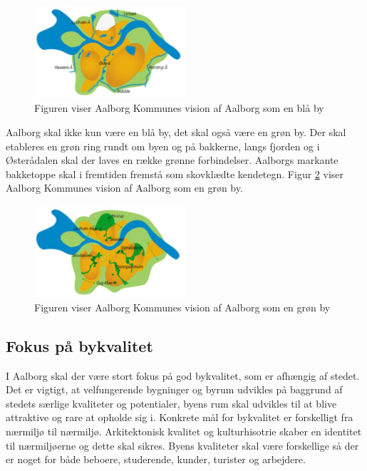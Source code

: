 \begin{figure}[H] 
\centering
\includegraphics[width=0.50\textwidth]{billeder/Byudviklingsprincipper5}
\caption{Figuren viser Aalborg Kommunes vision af Aalborg som en blå by}
\label{fig:Byudviklingsprincipper5}
\end{figure}

Aalborg skal ikke kun være en blå by, det skal også være en grøn by. Der skal etableres en grøn ring rundt om byen og på bakkerne, langs fjorden og i Østerådalen skal der laves en række grønne forbindelser. Aalborgs markante bakketoppe skal i fremtiden fremstå som skovklædte kendetegn. Figur \ref{fig:Byudviklingsprincipper6} viser Aalborg Kommunes vision af Aalborg som en grøn by.

\begin{figure}[H] 
\centering
\includegraphics[width=0.50\textwidth]{billeder/Byudviklingsprincipper6}
\caption{Figuren viser Aalborg Kommunes vision af Aalborg som en grøn by}
\label{fig:Byudviklingsprincipper6}
\end{figure}


\subsection{Fokus på bykvalitet}
I Aalborg skal der være stort fokus på god bykvalitet, som er afhængig af stedet. Det er vigtigt, at velfungerende bygninger og byrum udvikles på baggrund af stedets særlige kvaliteter og potentialer, byens rum skal udvikles til at blive attraktive og rare at opholde sig i. Konkrete mål for bykvalitet er forskelligt fra nærmiljø til nærmiljø. Arkitektonisk kvalitet og kulturhisotrie skaber en identitet til nærmiljøerne og dette skal sikres. Byens kvaliteter skal være forskellige så der er noget for både beboere, studerende, kunder, turister og arbejdere.


